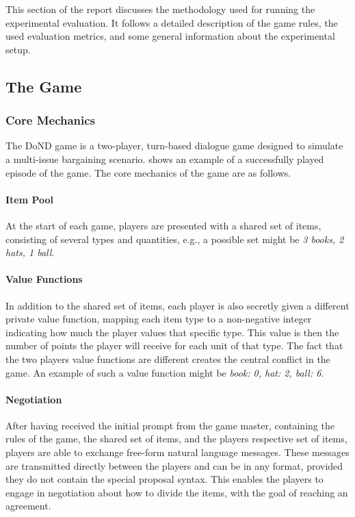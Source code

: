 
This section of the report discusses the methodology used for running the experimental evaluation. It follows a detailed description of the game rules, the used evaluation metrics, and some general information about the experimental setup.


\subsection{The Game}

\subsubsection{Core Mechanics}

The DoND game is a two-player, turn-based dialogue game designed to simulate a multi-issue bargaining scenario.  shows an example of a successfully played episode of the game. The core mechanics of the game are as follows.

\paragraph{Item Pool}
At the start of each game, players are presented with a shared set of items, consisting of several types and quantities, e.g., a possible set might be \textit{3 books, 2 hats, 1 ball}. 

\paragraph{Value Functions}
In addition to the shared set of items, each player is also secretly given a different private value function, mapping each item type to a non-negative integer indicating how much the player values that specific type. This value is then the number of points the player will receive for each unit of that type. The fact that the two players value functions are different creates the central conflict in the game. An example of such a value function might be \textit{book: 0, hat: 2, ball: 6}.

\paragraph{Negotiation}
After having received the initial prompt from the game master, containing the rules of the game, the shared set of items, and the players respective set of items, players are able to exchange free-form natural language messages. These messages are transmitted directly between the players and can be in any format, provided they do not contain the special proposal syntax. This enables the players to engage in negotiation about how to divide the items, with the goal of reaching an agreement.

